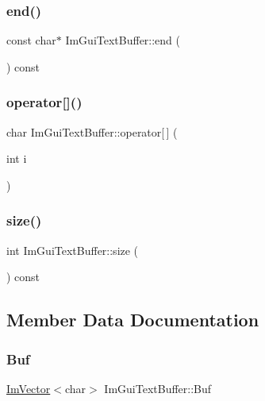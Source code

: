\hypertarget{struct_im_gui_text_buffer_a2fc30ad0d384f98dfcea722f798d91f2}{}\label{struct_im_gui_text_buffer_a2fc30ad0d384f98dfcea722f798d91f2} 
\subsubsection{\texorpdfstring{end()}{end()}}
{\footnotesize\ttfamily const char$\ast$ Im\+Gui\+Text\+Buffer\+::end (\begin{DoxyParamCaption}{ }\end{DoxyParamCaption}) const}

\hypertarget{struct_im_gui_text_buffer_a8550f53463fd12711e3d08b740227bd4}{}\label{struct_im_gui_text_buffer_a8550f53463fd12711e3d08b740227bd4} 
\subsubsection{\texorpdfstring{operator[]()}{operator[]()}}
{\footnotesize\ttfamily char Im\+Gui\+Text\+Buffer\+::operator\mbox{[}$\,$\mbox{]} (\begin{DoxyParamCaption}\item[{int}]{i }\end{DoxyParamCaption})}

\hypertarget{struct_im_gui_text_buffer_a2811fcd43e0224eb3bd0f3464b634289}{}\label{struct_im_gui_text_buffer_a2811fcd43e0224eb3bd0f3464b634289} 
\subsubsection{\texorpdfstring{size()}{size()}}
{\footnotesize\ttfamily int Im\+Gui\+Text\+Buffer\+::size (\begin{DoxyParamCaption}{ }\end{DoxyParamCaption}) const}



\subsection{Member Data Documentation}
\hypertarget{struct_im_gui_text_buffer_aa6de034b1920cdae5505cc58abf14240}{}\label{struct_im_gui_text_buffer_aa6de034b1920cdae5505cc58abf14240} 
\subsubsection{\texorpdfstring{Buf}{Buf}}
{\footnotesize\ttfamily \hyperlink{class_im_vector}{Im\+Vector}$<$char$>$ Im\+Gui\+Text\+Buffer\+::\+Buf}

